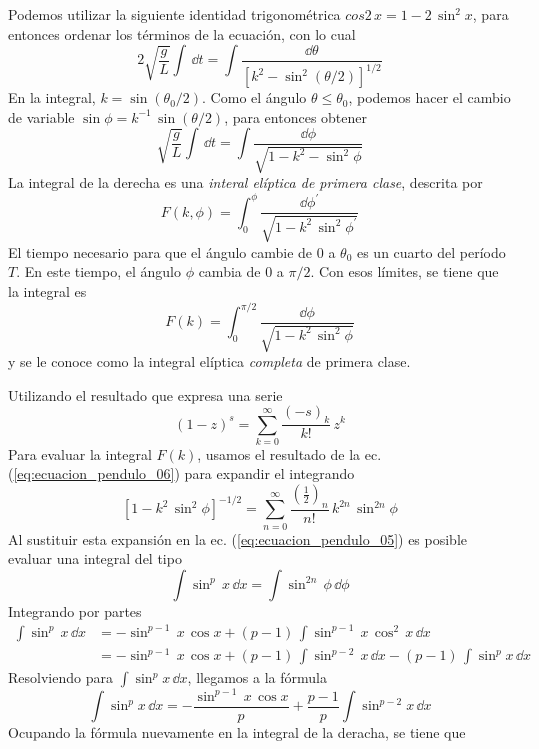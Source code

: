 Podemos utilizar la siguiente identidad trigonométrica $cos 2 \, x = 1 - 2 \, \sin^{2} x$, para entonces ordenar los términos de la ecuación, con lo cual
\[ 2 \sqrt{\dfrac{g}{L}} \int \, \dd t = \int \dfrac{\dd \theta}{[k^{2} - \sin^{2} (\theta/2)]^{1/2}}
\]
En la integral, $k = \sin (\theta_{0}/2)$. Como el ángulo $\theta \leq \theta_{0}$, podemos hacer el cambio de variable $\sin \phi = k^{-1} \, \sin (\theta/2)$, para entonces obtener
\[ \sqrt{\dfrac{g}{L}} \int \, \dd t = \int \dfrac{\dd \phi}{\sqrt{1- k^{2} - \sin^{2} \phi}} \]
La integral de la derecha es una \emph{interal elíptica de primera clase}, descrita por
\[ F(k , \phi) = \int_{0}^{\phi} \dfrac{\dd \phi^{\prime}}{\sqrt{1 - k^{2} \, \sin^{2} \phi^{\prime} }} \]
El tiempo necesario para que el ángulo cambie de $0$ a $\theta_{0}$ es un cuarto del período $T$. En este tiempo, el ángulo $\phi$ cambia de $0$ a $\pi/2$. Con esos límites, se tiene que la integral es
\begin{equation}
F(k) = \int_{0}^{\pi/2} \dfrac{\dd \phi}{\sqrt{1 - k^{2} \, \sin^{2} \phi} }
\label{eq:ecuacion_pendulo_05}
\end{equation}
y se le conoce como la integral elíptica \emph{completa} de primera clase.
\par
Utilizando el resultado que expresa una serie
\begin{equation}
(1 - z)^{s} = \sum_{k=0}^{\infty} \dfrac{(-s)_{k}}{k!} \, z^{k}
\label{eq:ecuacion_pendulo_06}
\end{equation}
Para evaluar la integral $F(k)$, usamos el resultado de la ec. (\ref{eq:ecuacion_pendulo_06}) para expandir el integrando
\[ [ 1 - k^{2} \, \sin^{2} \phi ]^{-1/2} = \sum_{n=0}^{\infty} \dfrac{(\frac{1}{2})_{n}}{n!} \, k^{2 n} \, \sin^{2 n} \phi \]
Al sustituir esta expansión en la ec. (\ref{eq:ecuacion_pendulo_05}) es posible evaluar una integral del tipo
\[ \int \sin^{p} \, x \, \dd x = \int \sin^{2 n} \, \phi \, \dd \phi \]
Integrando por partes
\begin{align*}
\int \sin^{p} \, x \, \dd x &= - \sin^{p-1} \, x \, \cos x + (p - 1) \, \int \sin^{p-1} \, x \, \cos^{2} \, x \, \dd x \\
&= -\sin^{p-1} \, x \, \cos x + (p - 1) \, \int \sin^{p-2} \, x \, \dd x - (p - 1) \, \int \sin^{p} x \, \dd x 
\end{align*}
Resolviendo para $\displaystyle{\int \sin^{p} x \, \dd x}$, llegamos a la fórmula
\[ \int \sin^{p} x \, \dd x = - \dfrac{\sin^{p-1} \, x \, \cos x}{p} + \dfrac{p - 1}{p} \int \sin^{p-2} x \, \dd x \]
Ocupando la fórmula nuevamente en la integral de la deracha, se tiene que

